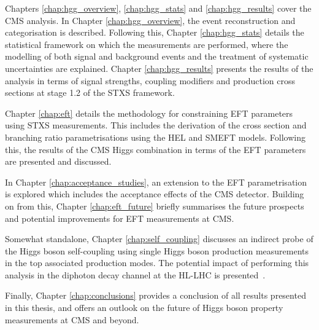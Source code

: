 Chapters {\color{blue}\ref{chap:hgg_overview}}, {\color{blue}\ref{chap:hgg_stats}} and {\color{blue}\ref{chap:hgg_results}} cover the CMS \Hgg analysis. In Chapter {\color{blue}\ref{chap:hgg_overview}}, the event reconstruction and categorisation is described. Following this, Chapter {\color{blue}\ref{chap:hgg_stats}} details the statistical framework on which the measurements are performed, where the modelling of both signal and background events and the treatment of systematic uncertainties are explained. Chapter {\color{blue}\ref{chap:hgg_results}} presents the results of the analysis in terms of signal strengths, coupling modifiers and production cross sections at stage 1.2 of the STXS framework.

Chapter {\color{blue}\ref{chap:eft}} details the methodology for constraining EFT parameters using STXS measurements. This includes the derivation of the cross section and branching ratio parametrisations using the HEL and SMEFT models. Following this, the results of the CMS Higgs combination in terms of the EFT parameters are presented and discussed.

In Chapter {\color{blue}\ref{chap:acceptance_studies}}, an extension to the EFT parametrisation is explored which includes the acceptance effects of the CMS detector. Building on from this, Chapter {\color{blue}\ref{chap:eft_future}} briefly summarises the future prospects and potential improvements for EFT measurements at CMS.

Somewhat standalone, Chapter {\color{blue}\ref{chap:self_coupling}} discusses an indirect probe of the Higgs boson self-coupling using single Higgs boson production measurements in the top associated production modes. The potential impact of performing this analysis in the diphoton decay channel at the HL-LHC is presented~\cite{Cepeda:2019klc,CMS-PAS-FTR-18-020}.

Finally, Chapter {\color{blue}\ref{chap:conclusions}} provides a conclusion of all results presented in this thesis, and offers an outlook on the future of Higgs boson property measurements at CMS and beyond.